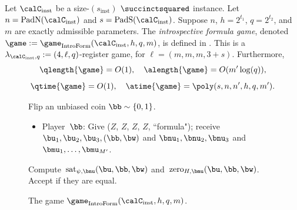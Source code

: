 \begin{definition}\label{def:formula-game}
Let $\calC_{\mathrm{inst}}$ be a size-$(s_{\mathrm{inst}})$ $\succinctsquared$ instance.
Let $n = \mathrm{PadN}(\calC_{\mathrm{inst}})$ and $s = \mathrm{PadS}(\calC_{\mathrm{inst}})$.
Suppose $n$, $h = 2^{t_1}$, $q = 2^{t_2}$, and $m$ are exactly admissible parameters.
The \emph{introspective formula game},
denoted $\game := \game_{\mathrm{IntroForm}}(\calC_{\mathrm{inst}}, h, q, m)$, is defined in .
This is a $\lambda_{\calC_{\mathrm{inst}}, q} := (4, \ell, q)$-register game, for $\ell = (m, m, m, 3 + s)$.
Furthermore,
\begin{equation*}
\qlength{\game} = O(1), \quad
\alength{\game} = O(m' \log(q)),
\end{equation*}
\begin{equation*}
\qtime{\game} = O(1), \quad
\atime{\game} = \poly(s, n, n', h, q, m').
\end{equation*}
\end{definition}
{
\begin{figure}
Flip an unbiased coin $\bb \sim \{0, 1\}$.
	\begin{itemize}
	\item[$\circ$] Player~$\bb$: Give ($Z$, $Z$, $Z$, $Z$, ``formula"); 
				receive $\bu_1, \bu_2, \bu_3, (\bb, \bw)$ and $\bnu_1, \bnu_2, \bnu_3$ and $\bmu_1, \ldots, \bmu_{M'}$.
	\end{itemize}
	Compute~$\mathrm{sat}_{\psi, \bnu}(\bu, \bb, \bw)$ and~$\mathrm{zero}_{H, \bmu}(\bu, \bb, \bw)$.
	Accept if they are equal.
	\caption{The game $\game_{\mathrm{IntroForm}}(\calC_{\mathrm{inst}}, h, q, m)$.\label{fig:formula-game}}
\end{figure}
}

